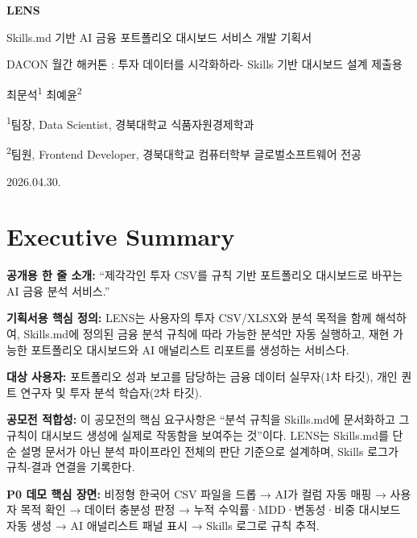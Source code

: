 \documentclass[10pt,a4paper]{article}
\begin{document}
\begin{titlepage}
\centering
\vspace*{28mm}
{\Huge\bfseries LENS\par}
\vspace{6mm}
{\Large Skills.md 기반 AI 금융 포트폴리오 대시보드 서비스 개발 기획서\par}
\vspace{10mm}
{\large DACON 월간 해커톤 : 투자 데이터를 시각화하라- Skills 기반 대시보드 설계 제출용\par}
\vspace{24mm}
{\large
최문석\textsuperscript{1} \quad 최예윤\textsuperscript{2}\par}
\vspace{5mm}
{\normalsize
\textsuperscript{1}팀장, Data Scientist, 경북대학교 식품자원경제학과\par
\textsuperscript{2}팀원, Frontend Developer, 경북대학교 컴퓨터학부 글로벌소프트웨어 전공\par}
\vfill
{\large 2026.04.30.\par}
\end{titlepage}
\tableofcontents
\newpage
\section{Executive Summary}\label{executive-summary}

\textbf{공개용 한 줄 소개:}
``제각각인 투자 CSV를 규칙 기반 포트폴리오 대시보드로 바꾸는 AI 금융 분석 서비스.''

\textbf{기획서용 핵심 정의:}
LENS는 사용자의 투자 CSV/XLSX와 분석 목적을 함께 해석하여, Skills.md에 정의된 금융 분석 규칙에 따라 가능한 분석만 자동 실행하고, 재현 가능한 포트폴리오 대시보드와 AI 애널리스트 리포트를 생성하는 서비스다.

\textbf{대상 사용자:} 포트폴리오 성과 보고를 담당하는 금융 데이터 실무자(1차 타깃), 개인 퀀트 연구자 및 투자 분석 학습자(2차 타깃).

\textbf{공모전 적합성:} 이 공모전의 핵심 요구사항은 ``분석 규칙을 Skills.md에 문서화하고 그 규칙이 대시보드 생성에 실제로 작동함을 보여주는 것''이다. LENS는 Skills.md를 단순 설명 문서가 아닌 분석 파이프라인 전체의 판단 기준으로 설계하며, Skills 로그가 규칙-결과 연결을 기록한다.

\textbf{P0 데모 핵심 장면:} 비정형 한국어 CSV 파일을 드롭 → AI가 컬럼 자동 매핑 → 사용자 목적 확인 → 데이터 충분성 판정 → 누적 수익률·MDD·변동성·비중 대시보드 자동 생성 → AI 애널리스트 패널 표시 → Skills 로그로 규칙 추적.
\end{document}
